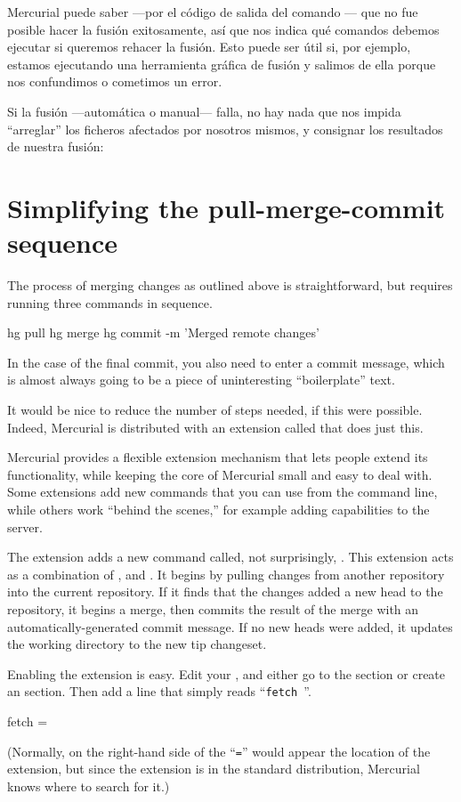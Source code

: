 Mercurial puede saber ---por el código de salida del comando
--- que no fue posible hacer la fusión exitosamente,
así que nos indica qué comandos debemos ejecutar si queremos rehacer
la fusión. Esto puede ser útil si, por ejemplo, estamos ejecutando una
herramienta gráfica de fusión y salimos de ella porque nos confundimos
o cometimos un error.

Si la fusión ---automática o manual--- falla, no hay nada que nos
impida ``arreglar'' los ficheros afectados por nosotros mismos, y
consignar los resultados de nuestra fusión:

\section{Simplifying the pull-merge-commit sequence}
\label{sec:tour-merge:fetch}

The process of merging changes as outlined above is straightforward,
but requires running three commands in sequence.
\begin{codesample2}
  hg pull
  hg merge
  hg commit -m 'Merged remote changes'
\end{codesample2}
In the case of the final commit, you also need to enter a commit
message, which is almost always going to be a piece of uninteresting
``boilerplate'' text.

It would be nice to reduce the number of steps needed, if this were
possible.  Indeed, Mercurial is distributed with an extension called
 that does just this.

Mercurial provides a flexible extension mechanism that lets people
extend its functionality, while keeping the core of Mercurial small
and easy to deal with.  Some extensions add new commands that you can
use from the command line, while others work ``behind the scenes,''
for example adding capabilities to the server.

The  extension adds a new command called, not
surprisingly, .  This extension acts as a combination of
,  and .  It begins by pulling
changes from another repository into the current repository.  If it
finds that the changes added a new head to the repository, it begins a
merge, then commits the result of the merge with an
automatically-generated commit message.  If no new heads were added,
it updates the working directory to the new tip changeset.

Enabling the  extension is easy.  Edit your
, and either go to the  section
or create an  section.  Then add a line that
simply reads ``\Verb+fetch +''.
\begin{codesample2}
  [extensions]
  fetch =
\end{codesample2}
(Normally, on the right-hand side of the ``\texttt{=}'' would appear
the location of the extension, but since the  extension
is in the standard distribution, Mercurial knows where to search for
it.)


